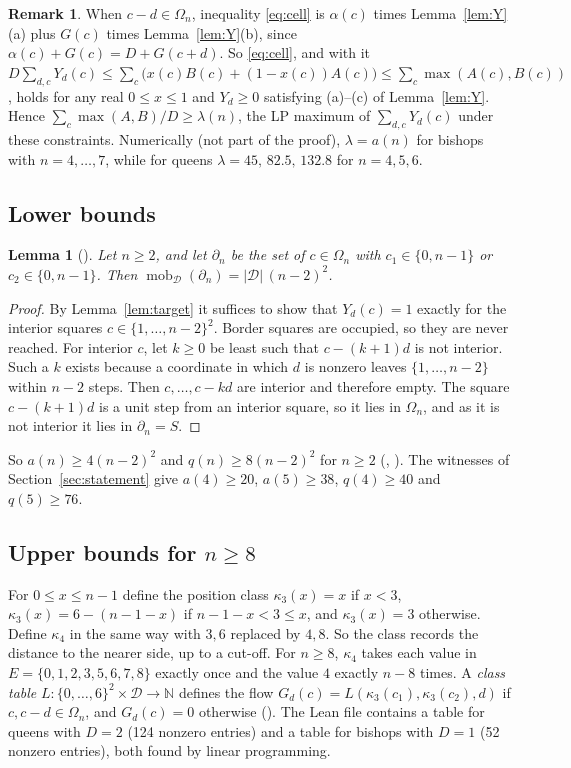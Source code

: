 \documentclass[11pt]{amsart}
\theoremstyle{plain}
\newtheorem{lemma}[theorem]{Lemma}
\theoremstyle{definition}
\newtheorem{remark}[theorem]{Remark}
\newcommand{\N}{\mathbb{N}}
\newcommand{\mob}{\operatorname{mob}}
\begin{document}
\begin{remark}\label{rem:lp}
When $c-d\in\Omega_n$, inequality \eqref{eq:cell} is $\alpha(c)$ times Lemma~\ref{lem:Y}(a) plus $G(c)$ times Lemma~\ref{lem:Y}(b), since $\alpha(c)+G(c)=D+G(c+d)$. So \eqref{eq:cell}, and with it $D\sum_{d,c}Y_d(c)\le\sum_c\bigl(x(c)B(c)+(1-x(c))A(c)\bigr)\le\sum_c\max(A(c),B(c))$, holds for any real $0\le x\le1$ and $Y_d\ge0$ satisfying (a)--(c) of Lemma~\ref{lem:Y}. Hence $\sum_c\max(A,B)/D\ge\lambda(n)$, the LP maximum of $\sum_{d,c}Y_d(c)$ under these constraints. Numerically (not part of the proof), $\lambda=a(n)$ for bishops with $n=4,\dots,7$, while for queens $\lambda=45,\,82.5,\,132.8$ for $n=4,5,6$.
\end{remark}

\subsection{Lower bounds}

\begin{lemma}[]\label{lem:border}
Let $n\ge2$, and let $\partial_n$ be the set of $c\in\Omega_n$ with $c_1\in\{0,n-1\}$ or $c_2\in\{0,n-1\}$. Then $\mob_{\mathcal D}(\partial_n)=|\mathcal D|\,(n-2)^2$.
\end{lemma}
\begin{proof}
By Lemma~\ref{lem:target} it suffices to show that $Y_d(c)=1$ exactly for the interior squares $c\in\{1,\dots,n-2\}^2$. Border squares are occupied, so they are never reached. For interior $c$, let $k\ge0$ be least such that $c-(k+1)d$ is not interior. Such a $k$ exists because a coordinate in which $d$ is nonzero leaves $\{1,\dots,n-2\}$ within $n-2$ steps. Then $c,\dots,c-kd$ are interior and therefore empty. The square $c-(k+1)d$ is a unit step from an interior square, so it lies in $\Omega_n$, and as it is not interior it lies in $\partial_n=S$.
\end{proof}

So $a(n)\ge4(n-2)^2$ and $q(n)\ge8(n-2)^2$ for $n\ge2$ (, ). The witnesses of Section~\ref{sec:statement} give $a(4)\ge20$, $a(5)\ge38$, $q(4)\ge40$ and $q(5)\ge76$.

\subsection{Upper bounds for \texorpdfstring{$n\ge8$}{n >= 8}}
For $0\le x\le n-1$ define the position class $\kappa_3(x)=x$ if $x<3$, $\kappa_3(x)=6-(n-1-x)$ if $n-1-x<3\le x$, and $\kappa_3(x)=3$ otherwise. Define $\kappa_4$ in the same way with $3,6$ replaced by $4,8$. So the class records the distance to the nearer side, up to a cut-off. For $n\ge8$, $\kappa_4$ takes each value in $E=\{0,1,2,3,5,6,7,8\}$ exactly once and the value $4$ exactly $n-8$ times. A \emph{class table} $L\colon\{0,\dots,6\}^2\times\mathcal D\to\N$ defines the flow $G_d(c)=L(\kappa_3(c_1),\kappa_3(c_2),d)$ if $c,c-d\in\Omega_n$, and $G_d(c)=0$ otherwise (). The Lean file contains a table  for queens with $D=2$ (124 nonzero entries) and a table  for bishops with $D=1$ (52 nonzero entries), both found by linear programming.
\end{document}
